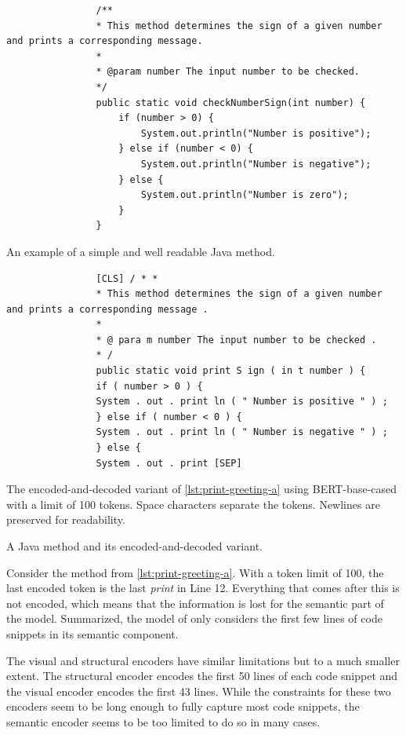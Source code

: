 \documentclass[%
class=scrreprt,
chapterprefix=false,%
open=right,%
twoside=false,%
paper=a4,%
logofile={Logo\_zentral\_farbig\_EN.png},%
thesistype=master,%
UKenglish,%
]{se2thesis}
\theoremstyle{definition}
\begin{document}
	\begin{listing}[p]
		\begin{sublisting}{\linewidth}
			\begin{verbatim}
				/**
				* This method determines the sign of a given number and prints a corresponding message.
				*
				* @param number The input number to be checked.
				*/
				public static void checkNumberSign(int number) {
					if (number > 0) {
						System.out.println("Number is positive");
					} else if (number < 0) {
						System.out.println("Number is negative");
					} else {
						System.out.println("Number is zero");
					}
				}
			\end{verbatim}
			\caption{An example of a simple and well readable Java method.}
			\label{lst:print-greeting-a}
		\end{sublisting}
		
		\begin{sublisting}{\linewidth}
			\begin{verbatim}
				[CLS] / * *
				* This method determines the sign of a given number and prints a corresponding message .
				*
				* @ para m number The input number to be checked .
				* /
				public static void print S ign ( in t number ) {
				if ( number > 0 ) {
				System . out . print ln ( " Number is positive " ) ;
				} else if ( number < 0 ) {
				System . out . print ln ( " Number is negative " ) ;
				} else {
				System . out . print [SEP]
			\end{verbatim}
			\caption{The encoded-and-decoded variant of \autoref{lst:print-greeting-a} using BERT-base-cased with a limit of 100 tokens. Space characters separate the tokens. Newlines are preserved for readability.}
			\label{lst:print-greeting-b}
		\end{sublisting}
		\caption{A Java method and its encoded-and-decoded variant.}
		\label{lst:print-greeting}
	\end{listing}
	
	Consider the method from \autoref{lst:print-greeting-a}. With a token limit of 100, the last encoded token is the last \textit{print} in Line 12. Everything that comes after this is not encoded, which means that the information is lost for the semantic part of the model. Summarized, the model of \citeauthor{mi2022towards} only considers the first few lines of code snippets in its semantic component.
	
	The visual and structural encoders have similar limitations but to a much smaller extent. The structural encoder encodes the first 50 lines of each code snippet and the visual encoder encodes the first 43 lines. While the constraints for these two encoders seem to be long enough to fully capture most code snippets, the semantic encoder seems to be too limited to do so in many cases.
\end{document}

